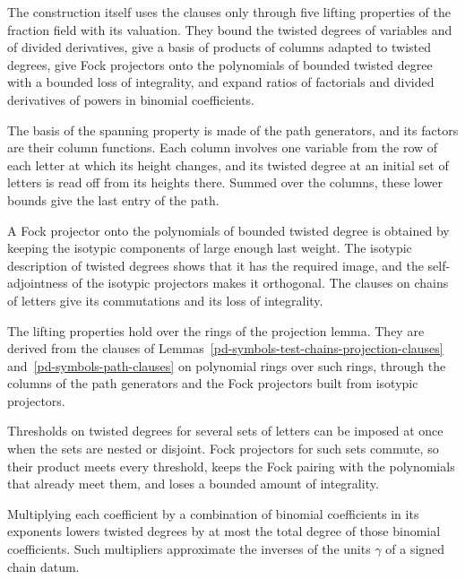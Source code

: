 The construction itself uses the clauses only through five lifting properties of the fraction field with its
valuation. They bound the twisted degrees of variables and of divided derivatives, give a basis of products of columns
adapted to twisted degrees, give Fock projectors onto the polynomials of bounded twisted degree with a bounded loss of
integrality, and expand ratios of factorials and divided derivatives of powers in binomial coefficients.

The basis of the spanning property is made of the path generators, and its factors are their column functions. Each
column involves one variable from the row of each letter at which its height changes, and its twisted degree at an
initial set of letters is read off from its heights there. Summed over the columns, these lower bounds give the last
entry of the path.

A Fock projector onto the polynomials of bounded twisted degree is obtained by keeping the isotypic components of
large enough last weight. The isotypic description of twisted degrees shows that it has the required image, and the
self-adjointness of the isotypic projectors makes it orthogonal. The clauses on chains of letters give its
commutations and its loss of integrality.

The lifting properties hold over the rings of the projection lemma. They are derived from the clauses of
Lemmas~\ref{pd-symbols-test-chains-projection-clauses} and~\ref{pd-symbols-path-clauses} on polynomial rings over such
rings, through the columns of the path generators and the Fock projectors built from isotypic projectors.

Thresholds on twisted degrees for several sets of letters can be imposed at once when the sets are nested or
disjoint. Fock projectors for such sets commute, so their product meets every threshold, keeps the Fock pairing with
the polynomials that already meet them, and loses a bounded amount of integrality.

Multiplying each coefficient by a combination of binomial coefficients in its exponents lowers twisted degrees by at
most the total degree of those binomial coefficients. Such multipliers approximate the inverses of the units $\gamma$
of a signed chain datum.

